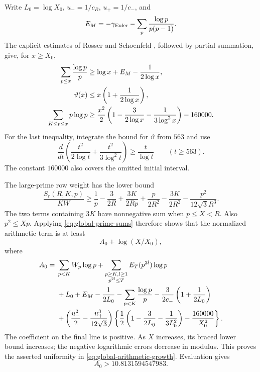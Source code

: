 Write $L_0=\log X_0$, $u_-=1/c_R$, $u_+=1/c_-$, and
\[
 E_M=-\gamma_{\rm Euler}-\sum_p\frac{\log p}{p(p-1)}.
\]
The explicit estimates of Rosser and Schoenfeld
\cite[Theorems 4 and 6]{rosserschoenfeld}, followed by partial summation,
give, for $x\geq X_0$,
\begin{align}
 \sum_{p\leq x}\frac{\log p}{p}
       &\geq\log x+E_M-\frac1{2\log x},\notag\\
 \vartheta(x)&\leq x\left(1+\frac1{2\log x}\right),\notag\\
 \sum_{K\leq p\leq x}p\log p
       &\geq\frac{x^2}{2}
         \left(1-\frac3{2\log x}-\frac1{3\log^2x}\right)-160000.
                                                    \label{eq:global-prime-sums}
\end{align}
For the last inequality, integrate the bound for $\vartheta$ from $563$
and use
\[
 \frac{d}{dt}\left(\frac{t^2}{2\log t}
                         +\frac{t^2}{3\log^2t}\right)
 \geq\frac{t}{\log t}\qquad(t\geq563).
\]
The constant $160000$ also covers the omitted initial interval.

The large-prime row weight has the lower bound
\[
 \frac{S_r(R,K,p)}{KW}
 \geq\frac1p-\frac3{2R}+\frac{3K}{2Rp}
            +\frac{p}{2R^2}-\frac{3K}{2R^2}
            -\frac{p^2}{12\sqrt3R^3}.
\]
The two terms containing $3K$ have nonnegative sum when $p\leq X<R$.
Also $p^2\leq Xp$. Applying \eqref{eq:global-prime-sums} therefore
shows that the normalized arithmetic term is at least
\begin{equation}\label{eq:global-arithmetic-growth}
 A_0+\log(X/X_0),
\end{equation}
where
\begin{align}
 A_0={}&\sum_{p<K}W_p\log p
    +\sum_{\substack{p\geq K, l\geq1\\p^{2l}\leq T}}
                                     E_T(p^{2l})\log p\notag\\
 &+L_0+E_M-\frac1{2L_0}-\sum_{p<K}\frac{\log p}{p}
       -\frac3{2c_-}\left(1+\frac1{2L_0}\right)\notag\\
 &+\left(\frac{u_-^2}{2}-\frac{u_+^3}{12\sqrt3}\right)
       \left\{\frac12\left(1-\frac3{2L_0}-\frac1{3L_0^2}\right)
                       -\frac{160000}{X_0^2}\right\}.
                                                    \label{eq:global-A0}
\end{align}
The coefficient on the final line is positive. As $X$ increases, its
braced lower bound increases; the negative logarithmic errors decrease
in modulus. This proves the asserted uniformity in
\eqref{eq:global-arithmetic-growth}. Evaluation gives
\begin{equation}\label{eq:global-A0-value}
 A_0>10.8131594547983.
\end{equation}


